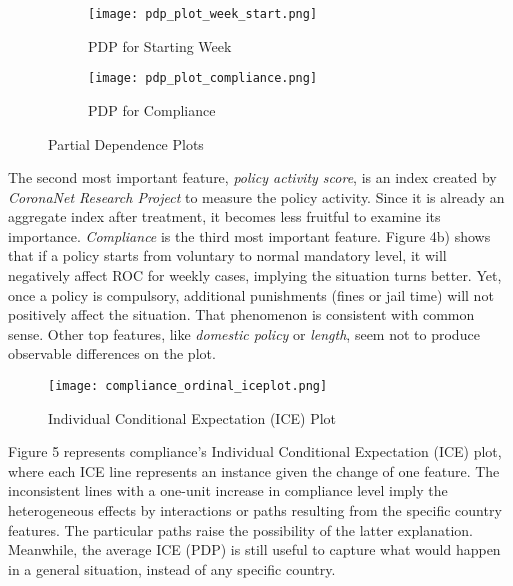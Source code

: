 \documentclass[12pt]{class}
\begin{document}
\begin{figure}[h]
\begin{subfigure}{0.5\textwidth}
  \texttt{[image: pdp\_plot\_week\_start.png]}
  \caption{PDP for Starting Week}
  \label{fig:subim1}
\end{subfigure}
\begin{subfigure}{0.5\textwidth}
  \texttt{[image: pdp\_plot\_compliance.png]}
  \caption{PDP for Compliance}
  \label{fig:subim2}
\end{subfigure}
\caption{Partial Dependence Plots}
\label{fig:image2}
\end{figure}

The second most important feature, \textit{policy activity score}, is an index created by \textit{CoronaNet Research Project} to measure the policy activity. Since it is already an aggregate index after treatment, it becomes less fruitful to examine its importance. \textit{Compliance} is the third most important feature. Figure 4b) shows that if a policy starts from voluntary to normal mandatory level, it will negatively affect ROC for weekly cases, implying the situation turns better. Yet, once a policy is compulsory, additional punishments (fines or jail time) will not positively affect the situation. That phenomenon is consistent with common sense. Other top features, like \textit{domestic policy} or \textit{length}, seem not to produce observable differences on the plot.\par 
\begin{figure}
    \centering
    \texttt{[image: compliance\_ordinal\_iceplot.png]}
    \caption{Individual Conditional Expectation (ICE) Plot}
    \label{fig:my_label}
\end{figure}
Figure 5 represents compliance’s Individual Conditional Expectation (ICE) plot, where each ICE line represents an instance given the change of one feature. The inconsistent lines with a one-unit increase in compliance level imply the heterogeneous effects by interactions or paths resulting from the specific country features. The particular paths raise the possibility of the latter explanation. Meanwhile, the average ICE (PDP) is still useful to capture what would happen in a general situation, instead of any specific country. \par 
\end{document}

